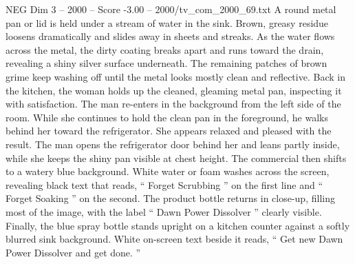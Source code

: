 \begin{textsample}{NEG Dim 3 – 2000 – Score -3.00 – 2000/tv\_com\_2000\_69.txt}
A round metal pan or lid is held under a stream of water in the sink.
Brown, greasy residue loosens dramatically and slides away in sheets and streaks.
As the water flows across the metal, the dirty coating breaks apart and runs toward the drain, revealing a shiny silver surface underneath.
The remaining patches of brown grime keep washing off until the metal looks mostly clean and reflective.
Back in the kitchen, the woman holds up the cleaned, gleaming metal pan, inspecting it with satisfaction.
The man re-enters in the background from the left side of the room.
While she continues to hold the clean pan in the foreground, he walks behind her toward the refrigerator.
She appears relaxed and pleased with the result.
The man opens the refrigerator door behind her and leans partly inside, while she keeps the shiny pan visible at chest height.
The commercial then shifts to a watery blue background.
White water or foam washes across the screen, revealing black text that reads, “ Forget Scrubbing ” on the first line and “ Forget Soaking ” on the second.
The product bottle returns in close-up, filling most of the image, with the label “ Dawn Power Dissolver ” clearly visible.
Finally, the blue spray bottle stands upright on a kitchen counter against a softly blurred sink background.
White on-screen text beside it reads, “ Get new Dawn Power Dissolver and get done. ”

\end{textsample}
